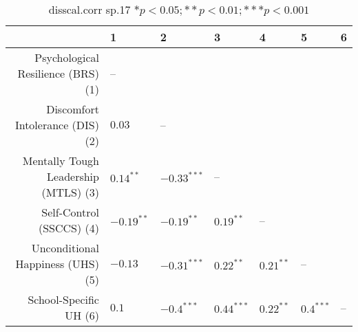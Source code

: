\begin{table}[ht]
\centering
\begin{tabular}{rllllll}
  \hline
 & 1 & 2 & 3 & 4 & 5 & 6 \\ 
  \hline
Psychological Resilience (BRS) (1) & -- &  &  &  &  &  \\ 
  Discomfort Intolerance (DIS) (2) & $0.03$ & -- &  &  &  &  \\ 
  Mentally Tough Leadership (MTLS) (3) & $0.14^{**}$ & $-0.33^{***}$ & -- &  &  &  \\ 
  Self-Control (SSCCS) (4) & $-0.19^{**}$ & $-0.19^{**}$ & $0.19^{**}$ & -- &  &  \\ 
  Unconditional Happiness (UHS) (5) & $-0.13$ & $-0.31^{***}$ & $0.22^{**}$ & $0.21^{**}$ & -- &  \\ 
  School-Specific UH (6) & $0.1$ & $-0.4^{***}$ & $0.44^{***}$ & $0.22^{**}$ & $0.4^{***}$ & -- \\ 
   \hline
\end{tabular}
\caption{disscal.corr sp.17 $* p < 0.05; ** p < 0.01; *** p < 0.001$} 
\label{freq_corr.disscal.corr.sp.17}
\end{table}
